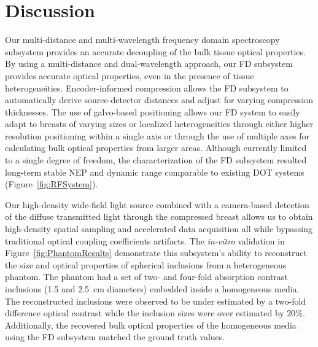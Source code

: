 


\section{Discussion}
\label{chap:omci:discussion}

Our multi-distance and multi-wavelength frequency domain spectroscopy subsystem provides an accurate decoupling of the bulk tissue optical properties. By using a multi-distance and dual-wavelength approach, our FD subsystem provides accurate optical properties, even in the presence of tissue heterogeneities. Encoder-informed compression allows the FD subsystem to automatically derive source-detector distances and adjust for varying compression thicknesses. The use of galvo-based positioning allows our FD system to easily adapt to breasts of varying sizes or localized heterogeneities through either higher resolution positioning within a single axis or through the use of multiple axes for calculating bulk optical properties from larger areas. Although currently limited to a single degree of freedom, the characterization of the FD subsystem resulted long-term stable NEP and dynamic range comparable to existing DOT systems (Figure~\ref{fig:RFSystem}).  

Our high-density wide-field light source combined with a camera-based detection of the diffuse transmitted light through the compressed breast allows us to obtain high-density spatial sampling and accelerated data acquisition all while bypassing traditional optical coupling coefficients artifacts. The \textit{in-vitro} validation in Figure~\ref{fig:PhantomResults} demonstrate this subsystem's ability to reconstruct the size and optical properties of spherical inclusions from a heterogeneous phantom. The phantom had a set of two- and four-fold absorption contrast inclusions (1.5 and 2.5~cm diameters) embedded inside a homogeneous media. The reconstructed inclusions were observed to be under estimated by a two-fold difference optical contrast while the inclusion sizes were over estimated by 20\%. Additionally, the recovered bulk optical properties of the homogeneous media using the FD subsystem matched the ground truth values.  


